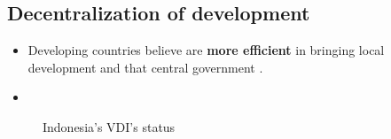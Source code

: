 \documentclass[
11pt,notheorems,compress,hyperref={pdfauthor=Maghfira Ramadhani}
]{beamer}
\begin{document}
\subsection{Decentralization of development}
\begin{frame}
\begin{itemize}
    \item Developing countries believe  are \alert{\textbf{more efficient}} in bringing local development \citep{vazquez_2017} and  that central government \citep{arends2020}.
    \item 
\end{itemize}
\end{frame}


\begin{frame}
    \begin{figure}[t]
    \hfill
    \caption{Indonesia's VDI's status}
    \label{f:graph1}
    \end{figure}
\end{frame}
\end{document}
